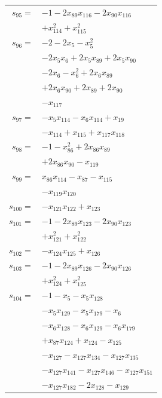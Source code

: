 \begin{longtable}{@{}r@{\;}l@{}}
\(s_{95}=\) & \(\displaystyle -1 -2x_{89}x_{116} -2x_{90}x_{116}\) \\
 & \(\displaystyle +x_{114}^{2} +x_{115}^{2}\) \\[3pt]
\(s_{96}=\) & \(\displaystyle -2 -2x_{5} -x_{5}^{2}\) \\
 & \(\displaystyle -2x_{5}x_{6} +2x_{5}x_{89} +2x_{5}x_{90}\) \\
 & \(\displaystyle -2x_{6} -x_{6}^{2} +2x_{6}x_{89}\) \\
 & \(\displaystyle +2x_{6}x_{90} +2x_{89} +2x_{90}\) \\
 & \(\displaystyle -x_{117}\) \\[3pt]
\(s_{97}=\) & \(\displaystyle -x_{5}x_{114} -x_{6}x_{114} +x_{19}\) \\
 & \(\displaystyle -x_{114} +x_{115} +x_{117}x_{118}\) \\[3pt]
\(s_{98}=\) & \(\displaystyle -1 -x_{86}^{2} +2x_{86}x_{89}\) \\
 & \(\displaystyle +2x_{86}x_{90} -x_{119}\) \\[3pt]
\(s_{99}=\) & \(\displaystyle x_{86}x_{114} -x_{87} -x_{115}\) \\
 & \(\displaystyle -x_{119}x_{120}\) \\[3pt]
\(s_{100}=\) & \(\displaystyle -x_{121}x_{122} +x_{123}\) \\[3pt]
\(s_{101}=\) & \(\displaystyle -1 -2x_{89}x_{123} -2x_{90}x_{123}\) \\
 & \(\displaystyle +x_{121}^{2} +x_{122}^{2}\) \\[3pt]
\(s_{102}=\) & \(\displaystyle -x_{124}x_{125} +x_{126}\) \\[3pt]
\(s_{103}=\) & \(\displaystyle -1 -2x_{89}x_{126} -2x_{90}x_{126}\) \\
 & \(\displaystyle +x_{124}^{2} +x_{125}^{2}\) \\[3pt]
\(s_{104}=\) & \(\displaystyle -1 -x_{5} -x_{5}x_{128}\) \\
 & \(\displaystyle -x_{5}x_{129} -x_{5}x_{179} -x_{6}\) \\
 & \(\displaystyle -x_{6}x_{128} -x_{6}x_{129} -x_{6}x_{179}\) \\
 & \(\displaystyle +x_{87}x_{124} +x_{124} -x_{125}\) \\
 & \(\displaystyle -x_{127} -x_{127}x_{134} -x_{127}x_{135}\) \\
 & \(\displaystyle -x_{127}x_{141} -x_{127}x_{146} -x_{127}x_{151}\) \\
 & \(\displaystyle -x_{127}x_{182} -2x_{128} -x_{129}\) \\

\end{longtable}
